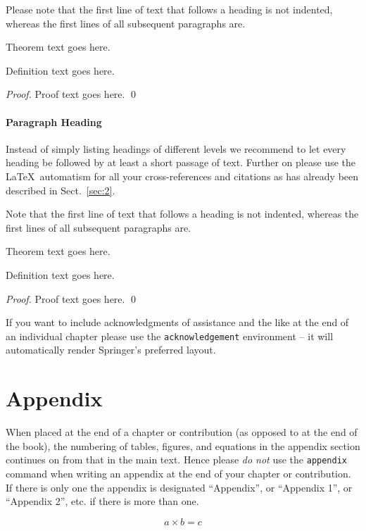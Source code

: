 \documentclass[graybox]{svmult}
\begin{document}
Please note that the first line of text that follows a heading is not indented, whereas the first lines of all subsequent paragraphs are.

\begin{theorem}
Theorem text goes here.
\end{theorem}
%
%
\begin{definition}
Definition text goes here.
\end{definition}

\begin{proof}
Proof text goes here.
\qed
\end{proof}

\paragraph{Paragraph Heading} %
Instead of simply listing headings of different levels we recommend to
let every heading be followed by at least a short passage of text.
Further on please use the \LaTeX\ automatism for all your
cross-references and citations as has already been described in
Sect.~\ref{sec:2}.

Note that the first line of text that follows a heading is not indented, whereas the first lines of all subsequent paragraphs are.
%
%
\begin{theorem}
Theorem text goes here.
\end{theorem}
%
\begin{definition}
Definition text goes here.
\end{definition}
%
\begin{proof}
\smartqed
Proof text goes here.
\qed
\end{proof}
%
\begin{acknowledgement}
If you want to include acknowledgments of assistance and the like at the end of an individual chapter please use the \verb|acknowledgement| environment -- it will automatically render Springer's preferred layout.
\end{acknowledgement}
%
\section*{Appendix}
%
%
When placed at the end of a chapter or contribution (as opposed to at the end of the book), the numbering of tables, figures, and equations in the appendix section continues on from that in the main text. Hence please \textit{do not} use the \verb|appendix| command when writing an appendix at the end of your chapter or contribution. If there is only one the appendix is designated ``Appendix'', or ``Appendix 1'', or ``Appendix 2'', etc. if there is more than one.

\begin{equation}
a \times b = c
\end{equation}


\end{document}

